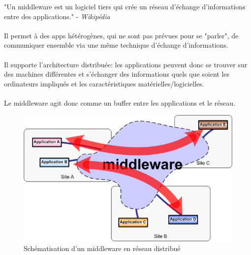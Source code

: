 \item{}
{"Un middleware est un logiciel tiers qui crée un réseau d'échange d'informations entre des applications." - \textit{Wikipédia}
\paragraph{}
Il permet à des apps hétérogènes, qui ne sont pas prévues pour se "parler", de communiquer ensemble via une même technique d'échange d'informations.
\paragraph{}
Il supporte l'architecture distribuée: les applications peuvent donc se trouver sur des machines différentes et s'échanger des informations quels que soient les ordinateurs impliqués et les caractéristiques matérielles/logicielles. 
\paragraph{}
Le middleware agit donc comme un buffer entre les applications et le réseau. 

\begin{figure}[h!]
\center\includegraphics[scale=.4]{images/middleware}
\caption{Schématisation d'un middleware en réseau distribué \cite{ref8}}
\end{figure}

}
